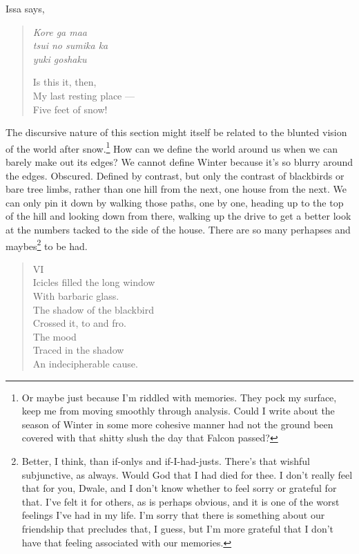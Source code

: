\documentclass[12pt]{memoir}
\begin{document}
Issa says,

\begin{verse}
\begin{multicols}{2}
\emph{Kore ga maa} \\
\emph{tsui no sumika ka} \\
\emph{yuki goshaku}

\columnbreak

Is this it, then, \\
My last resting place --- \\
Five feet of snow!
\end{multicols}
\vspace{-1em}
\parencite[37]{issa}
\end{verse}

The discursive nature of this section might itself be related to the blunted vision of the world after snow.\footnote{Or maybe just because I'm riddled with memories. They pock my surface, keep me from moving smoothly through analysis. Could I write about the season of Winter in some more cohesive manner had not the ground been covered with that shitty slush the day that Falcon passed?} How can we define the world around us when we can barely make out its edges? We cannot define Winter because it's so blurry around the edges. Obscured. Defined by contrast, but only the contrast of blackbirds or bare tree limbs, rather than one hill from the next, one house from the next. We can only pin it down by walking those paths, one by one, heading up to the top of the hill and looking down from there, walking up the drive to get a better look at the numbers tacked to the side of the house. There are so many perhapses and maybes\footnote{Better, I think, than if-onlys and if-I-had-justs. There's that wishful subjunctive, as always. Would God that I had died for thee. I don't really feel that for you, Dwale, and I don't know whether to feel sorry or grateful for that. I've felt it for others, as is perhaps obvious, and it is one of the worst feelings I've had in my life. I'm sorry that there is something about our friendship that precludes that, I guess, but I'm more grateful that I don't have that feeling associated with our memories.} to be had.

\begin{verse}

VI \\
Icicles filled the long window \\
With barbaric glass. \\
The shadow of the blackbird \\
Crossed it, to and fro. \\
The mood \\
Traced in the shadow \\
An indecipherable cause.

\parencite{blackbird}
\end{verse}
\end{document}

